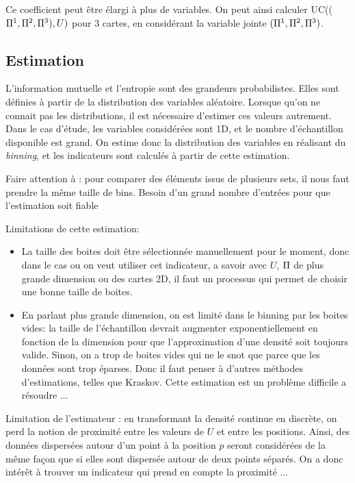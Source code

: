 Ce coefficient peut être élargi à plus de variables. On peut ainsi calculer UC(($\Pi^1,\Pi^2,\Pi^3),U)$ pour 3 cartes, en considérant la variable jointe $(\Pi^1,\Pi^2,\Pi^3)$.

\subsection{Estimation}

L'information mutuelle et l'entropie sont des grandeurs probabilistes. Elles sont définies à partir de la distribution des variables aléatoire. Lorsque qu'on ne connait pas les distributions, il est nécessaire d'estimer ces valeurs autrement. 
Dans le cas d'étude, les variables considérées sont 1D, et le nombre d'échantillon disponible est grand. On estime donc la distribution des variables en réalisant du \emph{binning}, et les indicateurs sont calculés à partir de cette estimation. 

Faire attention à : 
pour comparer des éléments issus de plusieurs sets, il nous faut prendre la même taille de bins. 
Besoin d'un grand nombre d'entrées pour que l'estimation soit fiable


Limitations de cette estimation:
\begin{itemize}
\item La taille des boites doit être sélectionnée manuellement pour le moment, donc dans le cas ou on veut utiliser cet indicateur, a savoir avec $U$, $\Pi$ de plus grande dimension ou des cartes 2D, il faut un processus qui permet de choisir une bonne taille de boites.
\item En parlant plus grande dimension, on est limité dans le binning par les boites vides: la taille de l'échantillon devrait augmenter exponentiellement en fonction de la dimension pour que l'approximation d'une densité soit toujours valide. Sinon, on a trop de boites vides qui ne le snot que parce que les données sont trop éparses. Donc il faut penser à d'autres méthodes d'estimations, telles que Kraskov. Cette estimation est un problème difficile a résoudre ...
\end{itemize}

Limitation de l'estimateur : en transformant la densité continue en discrète, on perd la notion de proximité entre les valeurs de $U$ et entre les positions. Ainsi, des données dispersées autour d'un point à la position $p$ seront considérées de la même façon que si elles sont dispersée autour de deux points séparés. On a donc intérêt à trouver un indicateur qui prend en compte la proximité ...



